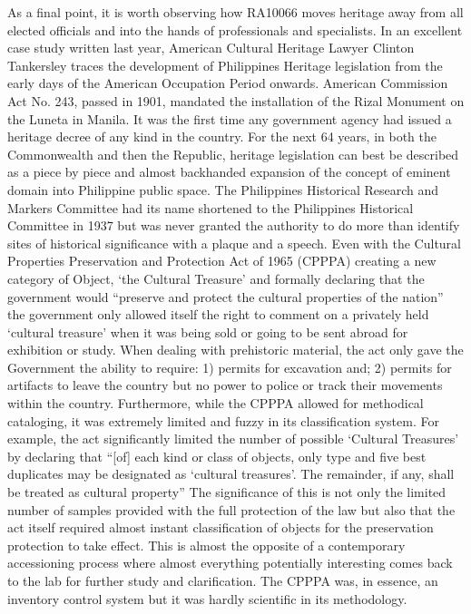 \documentclass[spanish]{ijsra}
\begin{document}
As a final point, it is worth observing how RA10066 moves heritage away from all elected officials and into the hands of professionals and specialists.  In an excellent case study written last year, American Cultural Heritage Lawyer Clinton Tankersley traces the development of Philippines Heritage legislation from the early days of the American Occupation Period onwards. American Commission Act No. \num{243}, passed in 1901, mandated the installation of the Rizal Monument on the Luneta in Manila. 
It was the first time any government agency had issued a heritage decree of any kind in the country.  For the next \num{64} years, in both the Commonwealth and then the Republic, heritage legislation can best be described as a piece by piece and almost backhanded expansion of the concept of eminent domain into Philippine public space. 
The Philippines Historical Research and Markers Committee had its name shortened to the Philippines Historical Committee in 1937 but was never granted the authority to do more than identify sites of historical significance with a plaque and a speech. Even with the Cultural Properties Preservation and Protection Act of 1965 (CPPPA) 
creating a new category of Object, ‘the Cultural Treasure’ and formally declaring that the government would “preserve and protect the cultural properties of the nation” %
the government only allowed itself the right to comment on a privately held ‘cultural treasure’ when it was being sold or going to be sent abroad for exhibition or study. When dealing with prehistoric material, the act only gave the Government the ability to require: 1) permits for excavation and; 2) permits for artifacts to leave the country but no power to police or track their movements within the country. Furthermore, while the CPPPA allowed for methodical cataloging, it was extremely limited and fuzzy in its classification system. For example, the act significantly limited the number of possible ‘Cultural Treasures’ by declaring that “[of] each kind or class of objects, only type and five best duplicates may be designated as ‘cultural treasures’. The remainder, if any, shall be treated as cultural property” %
The significance of this is not only the limited number of samples provided with the full protection of the law but also that the act itself required almost instant classification of objects for the preservation protection to take effect. This is almost the opposite of a contemporary accessioning process where almost everything potentially interesting comes back to the lab for further study and clarification. The CPPPA was, in essence, an inventory control system but it was hardly scientific in its methodology.
\end{document}
